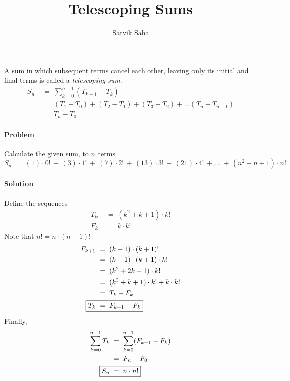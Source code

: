 \documentclass[a4paper, 11pt, reqno]{article}
\title{Telescoping Sums}
\author{Satvik Saha}
\date{}
\newcounter{prob}
\def\problem{\stepcounter{prob}\paragraph{Problem \arabic{prob}}}
\def\solution{\paragraph{Solution}}
\begin{document}
	\maketitle
	
	A sum in which subsequent terms cancel each other, leaving only its initial and final terms is called a
	\textit{telescoping sum}.
	\begin{align*}
		S_n  \; &= \; \sum_{k=0}^{n-1} (T_{k+1} - T_{k})	\\
		     \; &= \; (T_1 - T_0) + (T_2 - T_1) + (T_3 - T_2) + \dots (T_{n} - T_{n-1})	\\
		     \; &= \; T_{n} - T_{0}
	\end{align*}
	
	\problem
	Calculate the given sum, to $n$ terms
	\begin{equation*}
		S_n  \;=\;  (1)\cdot 0! \,+\, (3)\cdot 1! \,+\, (7)\cdot 2! \,+\, (13)\cdot 3! \,+\, (21)\cdot 4! \,+\, \dots \,+\, (n^2 - n + 1)\cdot n!
	\end{equation*}
	\solution
	Define the sequences
	\begin{align*}
		T_k  \; &= \;  (k^2 + k + 1)\cdot k! \\
		F_k  \; &= \;  k\cdot k!
	\end{align*}
	Note that $n! = n\cdot (n-1)!$
	\begin{align*}
		F_{k+1}  \; &= \; (k + 1)\cdot (k + 1)! \\
			 \; &= \; (k + 1)\cdot (k + 1)\cdot k! \\
			 \; &= \; (k^2 + 2k + 1)\cdot k! \\
			 \; &= \; (k^2 + k + 1)\cdot k! + k\cdot k! \\
			 \; &= \; T_k + F_k \\
		\Aboxed{T_k \; &= \;  F_{k+1} - F_{k}}
	\end{align*}
	Finally,
	\begin{align*}
		\sum_{k=0}^{n-1} T_k
		 	\; &= \; \sum_{k=0}^{n-1} (F_{k+1} - F_{k}) \\
			\; &= \; F_n - F_0 \\
		\Aboxed{S_n	\; &= \;  n\cdot n!}
	\end{align*}
\end{document}
